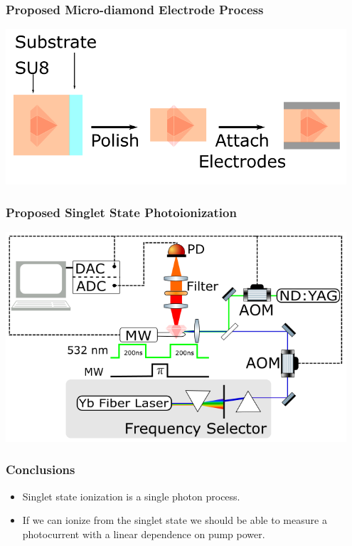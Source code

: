 \documentclass{beamer}
\begin{document}
\begin{frame}\frametitle{Proposed Micro-diamond Electrode Process}
    \centering
    \includegraphics[width=0.95\textwidth]{Images/ElectrodeProcess.png}
\end{frame}

\begin{frame}\frametitle{Proposed Singlet State Photoionization}
    \centering
    \includegraphics[width=0.95\textwidth]{Images/WP1Schematic.png}
\end{frame}

\begin{frame}\frametitle{Conclusions}
    \begin{itemize}
        \item Singlet state ionization is a single photon process.
        \item If we can ionize from the singlet state we should be able to measure a photocurrent with a linear dependence on pump power.
    \end{itemize}
\end{frame}
\end{document}
